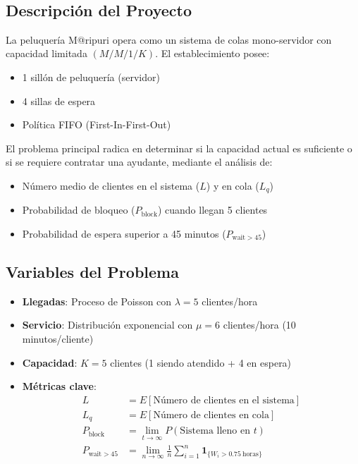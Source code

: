 \documentclass{article}
\begin{document}
\ 

\subsection{Descripción del Proyecto}
La peluquería M@ripuri opera como un sistema de colas mono-servidor con capacidad limitada $(M/M/1/K)$. El establecimiento posee:
\begin{itemize}
    \item 1 sillón de peluquería (servidor)
    \item 4 sillas de espera
    \item Política FIFO (First-In-First-Out)
\end{itemize}

El problema principal radica en determinar si la capacidad actual es suficiente o si se requiere contratar una ayudante, mediante el análisis de:
\begin{itemize}
    \item Número medio de clientes en el sistema ($L$) y en cola ($L_q$)
    \item Probabilidad de bloqueo ($P_{\text{block}}$) cuando llegan 5 clientes
    \item Probabilidad de espera superior a 45 minutos ($P_{\text{wait}>45}$)
\end{itemize}

\subsection{Variables del Problema}
\begin{itemize}
    \item \textbf{Llegadas}: Proceso de Poisson con $\lambda = 5$ clientes/hora
    \item \textbf{Servicio}: Distribución exponencial con $\mu = 6$ clientes/hora (10 minutos/cliente)
    \item \textbf{Capacidad}: $K = 5$ clientes (1 siendo atendido + 4 en espera)
    \item \textbf{Métricas clave}:
    \begin{align*}
        L &= E[\text{Número de clientes en el sistema}] \\
        L_q &= E[\text{Número de clientes en cola}] \\
        P_{\text{block}} &= \lim_{t\to\infty} P(\text{Sistema lleno en } t) \\
        P_{\text{wait}>45} &= \lim_{n\to\infty} \frac{1}{n}\sum_{i=1}^n \mathbf{1}_{\{W_i > 0.75\ \text{horas}\}}
    \end{align*}
\end{itemize}
\end{document}

